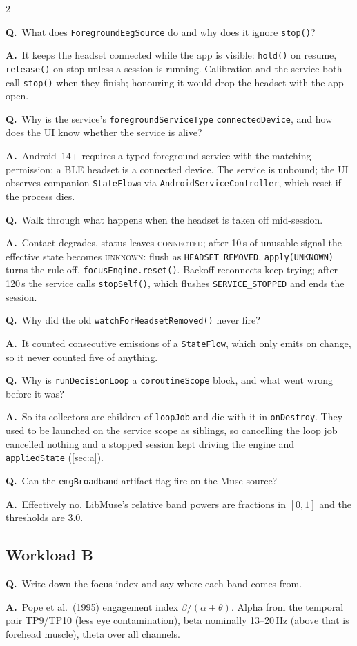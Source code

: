 \documentclass[10pt,a4paper]{article}
\newcommand{\code}[1]{\texttt{#1}}                  %
\newcommand{\state}[1]{\textsc{\small #1}}          %
\newcounter{qnum}
\newcommand{\Q}[2]{\stepcounter{qnum}\par\medskip\noindent
  \textbf{Q\theqnum.}\ #1\par\nobreak\smallskip\noindent
  {\color{teal}\textbf{A.}}\ #2\par}
\begin{document}
\begin{multicols}{2}
\Q{What does \code{ForegroundEegSource} do and why does it ignore \code{stop()}?}{It keeps the
headset connected while the app is visible: \code{hold()} on resume, \code{release()} on stop
unless a session is running. Calibration and the service both call \code{stop()} when they finish;
honouring it would drop the headset with the app open.}

\Q{Why is the service's \code{foregroundServiceType} \code{connectedDevice}, and how does the
UI know whether the service is alive?}{Android~14+ requires a typed foreground service with the
matching permission; a BLE headset is a connected device. The service is unbound; the UI observes
companion \code{StateFlow}s via \code{AndroidServiceController}, which reset if the process dies.}

\Q{Walk through what happens when the headset is taken off mid-session.}{Contact degrades, status
leaves \textsc{connected}; after 10\,s of unusable signal the effective state becomes
\state{unknown}: flush as \code{HEADSET\_REMOVED}, \code{apply(UNKNOWN)} turns the rule off,
\code{focusEngine.reset()}. Backoff reconnects keep trying; after 120\,s the service calls
\code{stopSelf()}, which flushes \code{SERVICE\_STOPPED} and ends the session.}

\Q{Why did the old \code{watchForHeadsetRemoved()} never fire?}{It counted consecutive emissions
of a \code{StateFlow}, which only emits on change, so it never counted five of anything.}

\Q{Why is \code{runDecisionLoop} a \code{coroutineScope} block, and what went wrong before it
was?}{So its collectors are children of \code{loopJob} and die with it in \code{onDestroy}. They
used to be launched on the service scope as siblings, so cancelling the loop job cancelled nothing
and a stopped session kept driving the engine and \code{appliedState} (\cref{sec:a}).}

\Q{Can the \code{emgBroadband} artifact flag fire on the Muse source?}{Effectively no. LibMuse's
relative band powers are fractions in $[0,1]$ and the thresholds are 3.0.}

\subsection*{Workload B}

\Q{Write down the focus index and say where each band comes from.}{Pope et al.\ (1995)
engagement index $\beta/(\alpha+\theta)$. Alpha from the temporal pair TP9/TP10 (less eye
contamination), beta nominally 13--20\,Hz (above that is forehead muscle), theta over all
channels.}


\end{multicols}
\end{document}
